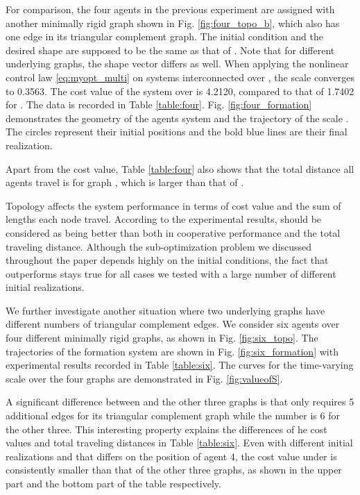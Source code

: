 \documentclass[times]{rncauth}
\begin{document}
For comparison, the four agents in the previous experiment are
assigned with another minimally rigid graph shown in Fig.
\ref{fig:four_topo_b}, which also has one edge in its triangular
complement graph. The initial condition and the desired shape are
supposed to be the same as that of . Note that for different
underlying graphs, the shape vector  differs as well. When
applying the nonlinear control law \eqref{eq:myopt_multi} on systems
interconnected over , the scale converges to 0.3563. The cost
value of the system over  is 4.2120, compared to that of 1.7402
for . The data is recorded in Table \ref{table:four}. Fig.
\ref{fig:four_formation} demonstrates the geometry of the agents
system and the trajectory of the scale . The circles
represent their initial positions
 and the bold blue lines are their final realization.

Apart from the cost value, Table \ref{table:four} also shows that
the total distance all agents travel is  for graph ,
which is larger than that of .

Topology affects the system performance in terms of cost value and
the sum of lengths each node travel. According to the experimental
results,  should be considered as being better than  both
in cooperative performance and the total traveling distance.
Although the sub-optimization problem we discussed throughout the
paper depends highly on the initial conditions, the fact that 
outperforms  stays true for all cases we tested with a large
number of different initial realizations.

We further investigate another situation where  two underlying
graphs have different numbers of triangular complement edges. We
consider six agents over four different minimally rigid graphs, as
shown in Fig. \ref{fig:six_topo}.  The trajectories of the formation
system are shown in Fig. \ref{fig:six_formation} with experimental
results recorded in Table \ref{table:six}. The curves for the
time-varying scale  over the four graphs are
demonstrated in Fig. \ref{fig:valueofS}.




A significant difference between  and the other three graphs is
that  only requires 5 additional edges for its triangular
complement graph while the number is 6 for the other three. This
interesting property explains the differences of he cost values and
total traveling distances in Table \ref{table:six}. Even with
different initial realizations  and 
that differs on the position of
 agent 4, the cost  value under  is consistently smaller than that of the other three graphs, as
shown in the upper part and the bottom part of the table
respectively.
\end{document}
